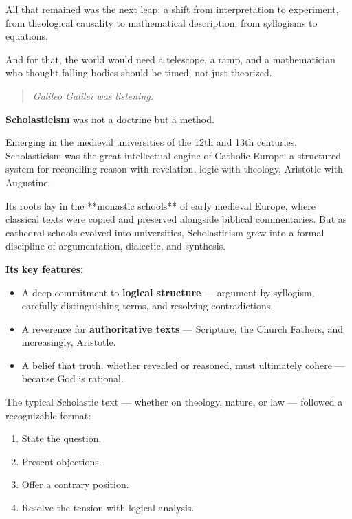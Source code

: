 All that remained was the next leap: a shift from interpretation to experiment, from theological causality to mathematical description, from syllogisms to equations.

And for that, the world would need a telescope, a ramp, and a mathematician who thought falling bodies should be timed, not just theorized.

\begin{quote}
    \textit{Galileo Galilei was listening.}
\end{quote}

\begin{tcolorbox}[colback=gray!5!white, colframe=black!75!white, title={Historical Sidebar: Scholasticism — The Logic of Faith}]

    \textbf{Scholasticism} was not a doctrine but a method.
    
    Emerging in the medieval universities of the 12th and 13th centuries, Scholasticism was the great intellectual engine of Catholic Europe: a structured system for reconciling reason with revelation, logic with theology, Aristotle with Augustine.
    
    Its roots lay in the **monastic schools** of early medieval Europe, where classical texts were copied and preserved alongside biblical commentaries. But as cathedral schools evolved into universities, Scholasticism grew into a formal discipline of argumentation, dialectic, and synthesis.
    
    \medskip
    
    \textbf{Its key features:}
    \begin{itemize}
        \item A deep commitment to \textbf{logical structure} — argument by syllogism, carefully distinguishing terms, and resolving contradictions.
        \item A reverence for \textbf{authoritative texts} — Scripture, the Church Fathers, and increasingly, Aristotle.
        \item A belief that truth, whether revealed or reasoned, must ultimately cohere — because God is rational.
    \end{itemize}
    
    The typical Scholastic text — whether on theology, nature, or law — followed a recognizable format:
    \begin{enumerate}
        \item State the question.
        \item Present objections.
        \item Offer a contrary position.
        \item Resolve the tension with logical analysis.
    \end{enumerate}
    

\end{tcolorbox}
